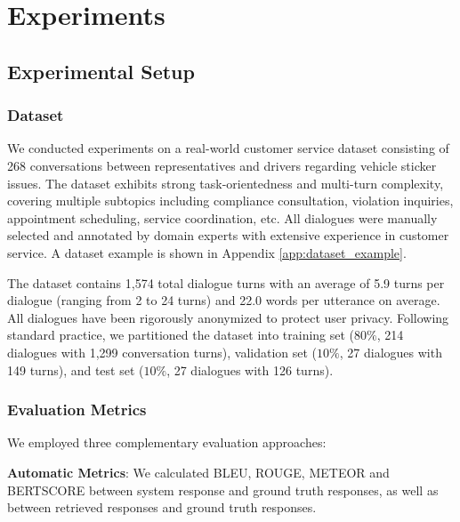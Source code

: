 \documentclass[
]{style/ceurart}
\begin{document}
\section{Experiments}

\subsection {Experimental Setup}  

\subsubsection {Dataset}  
We conducted experiments on a real-world customer service dataset consisting of 268 conversations between representatives and drivers regarding vehicle sticker issues. The dataset exhibits strong task-orientedness and multi-turn complexity, covering multiple subtopics including compliance consultation, violation inquiries, appointment scheduling, service coordination, etc. All dialogues were manually selected and annotated by domain experts with extensive experience in customer service. A dataset example is shown in Appendix \ref{app:dataset_example}.

The dataset contains 1,574 total dialogue turns with an average of 5.9 turns per dialogue (ranging from 2 to 24 turns) and 22.0 words per utterance on average. All dialogues have been rigorously anonymized to protect user privacy. Following standard practice, we partitioned the dataset into training set ($80\%$, 214 dialogues with 1,299 conversation turns), validation set ($10\%$, 27 dialogues with 149 turns), and test set ($10\%$, 27 dialogues with 126 turns). 

\subsubsection {Evaluation Metrics}
\label{sec:eval_metrics}

We employed three complementary evaluation approaches:

\textbf{Automatic Metrics}: We calculated BLEU, ROUGE, METEOR and BERTSCORE between system response and ground truth responses, as well as between retrieved responses and ground truth responses.
\end{document}
